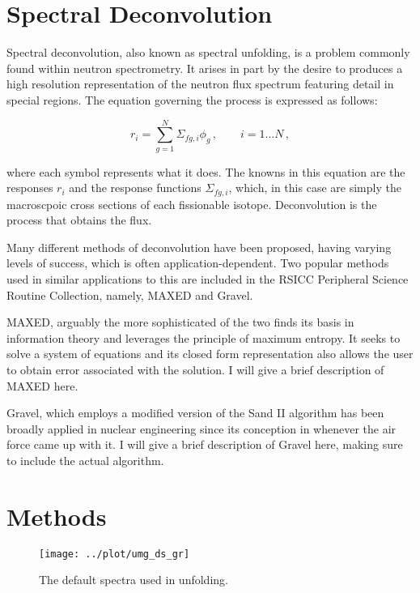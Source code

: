 \documentclass[journal]{IEEEtran}
\begin{document}
\section{Spectral Deconvolution}

Spectral deconvolution, also known as spectral unfolding, is a problem commonly found within neutron spectrometry.
It arises in part by the desire to produces a high resolution representation of the neutron flux spectrum featuring detail in special regions.
The equation governing the process is expressed as follows:

\begin{equation}
  r_i = \sum_{g=1}^{N} \Sigma_{fg,i}  \phi_g\, , 
    \qquad i = 1 \ldots N \, ,
\label{eq:response}
\end{equation}

where each symbol represents what it does.
The knowns in this equation are the responses $r_i$ and the response functions $\Sigma_{fg,i}$, which, in this case are simply the macroscpoic cross sections of each fissionable isotope.
Deconvolution is the process that obtains the flux.

Many different methods of deconvolution have been proposed, having varying levels of success, which is often application-dependent.
Two popular methods used in similar applications to this are included in the RSICC Peripheral Science Routine Collection, namely, MAXED and Gravel.

MAXED, arguably the more sophisticated of the two finds its basis in information theory and leverages the principle of maximum entropy.
It seeks to solve a system of equations and its closed form representation also allows the user to obtain error associated with the solution.
I will give a brief description of MAXED here.

Gravel, which employs a modified version of the Sand II algorithm has been broadly applied in nuclear engineering since its conception in whenever the air force came up with it.
I will give a brief description of Gravel here, making sure to include the actual algorithm.

\section{Methods}

\begin{figure}[h!tb]
  \centering
  \texttt{[image: ../plot/umg\_ds\_gr]}
  \caption{The default spectra used in unfolding.}
  \label{fig:default_spectra}
\end{figure}
\end{document}
